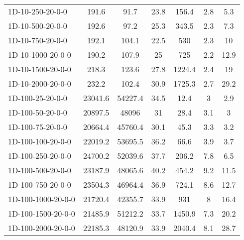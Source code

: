\documentclass{article}
\begin{document}
\begin{table}[h]
\begin{center}
\begin{tabular}{|l||c|c|c|c|c|c|}
            1D-10-250-20-0-0                      & 191.6   & 91.7       & 23.8       & 156.4       & 2.8       & 5.3        \\
            1D-10-500-20-0-0                      & 192.6   & 97.2       & 25.3       & 343.5       & 2.3       & 7.3        \\
            1D-10-750-20-0-0                      & 192.1   & 104.1      & 22.5       & 530         & 2.3       & 10         \\
            1D-10-1000-20-0-0                     & 190.2   & 107.9      & 25         & 725         & 2.2       & 12.9       \\
            1D-10-1500-20-0-0                     & 218.3   & 123.6      & 27.8       & 1224.4      & 2.4       & 19         \\
            1D-10-2000-20-0-0                     & 232.2   & 102.4      & 30.9       & 1725.3      & 2.7       & 29.2       \\
            \hline
            1D-100-25-20-0-0                       & 23041.6 & 54227.4    & 34.5       & 12.4        & 3         & 2.9        \\
            1D-100-50-20-0-0                       & 20897.5 & 48096      & 31         & 28.4        & 3.1       & 3          \\
            1D-100-75-20-0-0                       & 20664.4 & 45760.4    & 30.1       & 45.3        & 3.3       & 3.2        \\
            1D-100-100-20-0-0                      & 22019.2 & 53695.5    & 36.2       & 66.6        & 3.9       & 3.7        \\
            1D-100-250-20-0-0                      & 24700.2 & 52039.6    & 37.7       & 206.2       & 7.8       & 6.5        \\
            1D-100-500-20-0-0                      & 23187.9 & 48065.6    & 40.2       & 454.2       & 9.2       & 11.5       \\
            1D-100-750-20-0-0                      & 23504.3 & 46964.4    & 36.9       & 724.1       & 8.6       & 12.7       \\
            1D-100-1000-20-0-0                     & 21720.4 & 42355.7    & 33.9       & 931         & 8         & 16.4       \\
            1D-100-1500-20-0-0                     & 21485.9 & 51212.2    & 33.7       & 1450.9      & 7.3       & 20.2       \\
            1D-100-2000-20-0-0                     & 22185.3 & 48120.9    & 33.9       & 2040.4      & 8.1       & 28.7       \\

\end{tabular}
\end{center}
\end{table}
\end{document}
